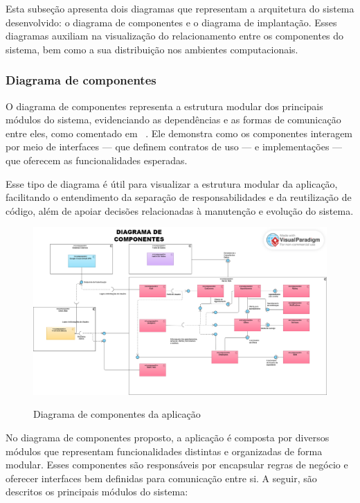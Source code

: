 Esta subseção apresenta dois diagramas que representam a arquitetura do sistema desenvolvido: o diagrama de componentes e o diagrama de implantação. Esses diagramas auxiliam na visualização do relacionamento entre os componentes do sistema, bem como a sua distribuição nos ambientes computacionais.

\subsubsection{Diagrama de componentes}

O diagrama de componentes representa a estrutura modular dos principais módulos do sistema, evidenciando as dependências e as formas de comunicação entre eles, como comentado em ~\cite{Booch2005}. Ele demonstra como os componentes interagem por meio de interfaces — que definem contratos de uso — e implementações — que oferecem as funcionalidades esperadas.

Esse tipo de diagrama é útil para visualizar a estrutura modular da aplicação, facilitando o entendimento da separação de responsabilidades e da reutilização de código, além de apoiar decisões relacionadas à manutenção e evolução do sistema.

\begin{figure}[htb]
  \centering
  \caption{Diagrama de componentes da aplicação}
  \includegraphics[width=\textwidth]{cap04-desenvolvimento/images/4-3-2-1-diagrama-componentes}
  \label{fig:diagrama-componente}
\end{figure}
\FloatBarrier


No diagrama de componentes proposto, a aplicação é composta por diversos módulos que representam funcionalidades distintas e organizadas de forma modular. Esses componentes são responsáveis por encapsular regras de negócio e oferecer interfaces bem definidas para comunicação entre si. A seguir, são descritos os principais módulos do sistema:

